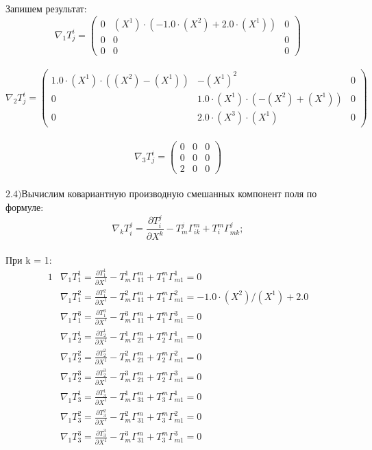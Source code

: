 \documentclass{article}
\begin{document}
Запишем результат:\\
\[
\nabla_1T^i_j = \begin{pmatrix}
	0 & (X^1)\cdot (-1.0\cdot (X^2) + 2.0\cdot (X^1)) & 0\\
	0 & 0 & 0\\
	0 & 0 & 0
\end{pmatrix}
\]\\
\[
\nabla_2T^i_j = \begin{pmatrix}
	1.0\cdot (X^1)\cdot ((X^2) - (X^1)) & -(X^1)^2 & 0\\
	0 & 1.0\cdot (X^1)\cdot (-(X^2) + (X^1)) & 0\\
	0 & 2.0\cdot (X^3)\cdot (X^1) & 0
\end{pmatrix}
\]\\
\[
\nabla_3T^i_j = \begin{pmatrix}
	0 & 0 & 0\\
	0 & 0 & 0\\
	2 & 0 & 0
\end{pmatrix}
\]\\
$\mathrm{2.4) }$Вычислим ковариантную производную смешанных компонент поля по формуле:\\
\[
\nabla_kT^j_i = \frac{\partial T^j_i}{\partial X^k} - T^j_m\Gamma^m_{ik} + T^m_i\Gamma^j_{mk};
\]\\
При k = 1:\\
\begin{alignat*}{1}
  & \nabla_1T^1_1 = \frac{\partial T^1_1}{\partial X^1} - T^1_m\Gamma^m_{11} + T^m_1\Gamma^1_{m1} = 0 \\
  & \nabla_1T^2_1 = \frac{\partial T^2_1}{\partial X^1} - T^2_m\Gamma^m_{11} + T^m_1\Gamma^2_{m1} = -1.0\cdot (X^2)/(X^1) + 2.0 \\
  & \nabla_1T^3_1 = \frac{\partial T^3_1}{\partial X^1} - T^3_m\Gamma^m_{11} + T^m_1\Gamma^3_{m1} = 0 \\
  & \nabla_1T^1_2 = \frac{\partial T^1_2}{\partial X^1} - T^1_m\Gamma^m_{21} + T^m_2\Gamma^1_{m1} = 0 \\
  & \nabla_1T^2_2 = \frac{\partial T^2_2}{\partial X^1} - T^2_m\Gamma^m_{21} + T^m_2\Gamma^2_{m1} = 0 \\
  & \nabla_1T^3_2 = \frac{\partial T^3_2}{\partial X^1} - T^3_m\Gamma^m_{21} + T^m_2\Gamma^3_{m1} = 0 \\
  & \nabla_1T^1_3 = \frac{\partial T^1_3}{\partial X^1} - T^1_m\Gamma^m_{31} + T^m_3\Gamma^1_{m1} = 0 \\
  & \nabla_1T^2_3 = \frac{\partial T^2_3}{\partial X^1} - T^2_m\Gamma^m_{31} + T^m_3\Gamma^2_{m1} = 0 \\
  & \nabla_1T^3_3 = \frac{\partial T^3_3}{\partial X^1} - T^3_m\Gamma^m_{31} + T^m_3\Gamma^3_{m1} = 0 
\end{alignat*}\\
\end{document}

